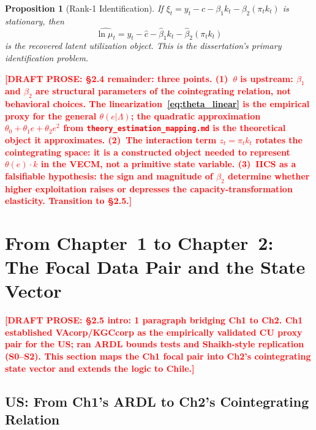 \documentclass[12pt,letterpaper]{article}
\newcommand{\mut}{\mu_t}           %
\newcommand{\pit}{\pi_t}           %
\newcommand{\draftnote}[1]{%
  \textcolor{red}{\textbf{[DRAFT PROSE: #1]}}}
\newtheorem{proposition}{Proposition}[section]
\begin{document}
\begin{proposition}[Rank-1 Identification]
\label{prop:rank1}
If $\xi_t = y_t - c - \beta_1 k_t - \beta_2(\pit k_t)$ is stationary, then
\begin{equation}
  \widehat{\ln\mut} = y_t - \hat{c} - \hat{\beta}_1 k_t - \hat{\beta}_2(\pit k_t)
  \label{eq:cv_estimated}
\end{equation}
is the recovered latent utilization object. This is the dissertation's
primary identification problem.
\end{proposition}

\draftnote{§2.4 remainder: three points. (1)~$\theta$ is upstream: $\beta_1$
  and $\beta_2$ are structural parameters of the cointegrating relation, not
  behavioral choices. The linearization~\eqref{eq:theta_linear} is the
  empirical proxy for the general $\theta(e|\Lambda)$; the quadratic
  approximation $\theta_0 + \theta_1 e + \theta_2 e^2$ from
  \texttt{theory\_estimation\_mapping.md} is the theoretical object it
  approximates. (2)~The interaction term $z_t = \pit k_t$ rotates the
  cointegrating space: it is a constructed object needed to represent
  $\theta(e)\cdot k$ in the VECM, not a primitive state variable.
  (3)~IICS as a falsifiable hypothesis: the sign and magnitude of $\beta_2$
  determine whether higher exploitation raises or depresses the
  capacity-transformation elasticity. Transition to §2.5.}


\section{From Chapter~1 to Chapter~2: The Focal Data Pair
  and the State Vector}
\label{sec:bridge}

\draftnote{§2.5 intro: 1 paragraph bridging Ch1 to Ch2.
  Ch1 established VAcorp/KGCcorp as the empirically validated CU proxy pair
  for the US; ran ARDL bounds tests and Shaikh-style replication (S0--S2).
  This section maps the Ch1 focal pair into Ch2's cointegrating state vector
  and extends the logic to Chile.}


\subsection{US: From Ch1's ARDL to Ch2's Cointegrating Relation}
\label{sec:bridge_us}
\end{document}

